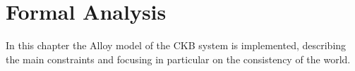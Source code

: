 \chapter{Formal Analysis}
In this chapter the Alloy model of the CKB system is implemented, describing the main constraints and focusing in particular on the consistency of the world.\\

